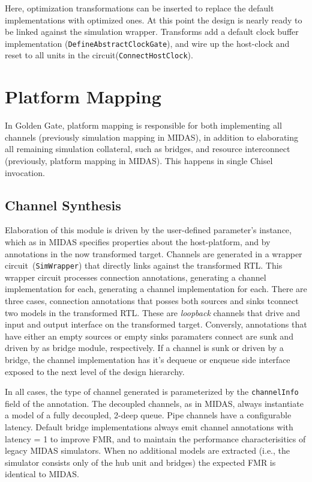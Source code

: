 Here, optimization transformations can be inserted to replace the default
implementations with optimized ones.  At this point the design is nearly ready
to be linked against the simulation wrapper.  Transforms add a default clock
buffer implementation (\texttt{DefineAbstractClockGate}), and wire up the
host-clock and reset to all units in the circuit(\texttt{ConnectHostClock}).

\section{Platform Mapping}\label{sec:gg-platform-mapping}

In Golden Gate, platform mapping is responsible for both implementing all
channels (previously simulation mapping in MIDAS), in addition to elaborating
all remaining simulation collateral, such as bridges, and resource interconnect
(previously, platform mapping in MIDAS). This happens in single Chisel
invocation.

\subsection{Channel Synthesis}
Elaboration of this module is driven by the user-defined parameter's instance,
which as in MIDAS specifies properties about the host-platform, and by
annotations in the now transformed target.  Channels are generated in a wrapper
circuit~(\texttt{SimWrapper}) that directly links against the transformed RTL.
This wrapper circuit processes connection annotations, generating a channel
implementation for each, generating a channel implementation for each.  There
are three cases, connection annotations that posses both sources and sinks
tconnect two models in the transformed RTL. These are \emph{loopback} channels
that drive and input and output interface on the transformed target. Conversly,
annotations that have either an empty sources or empty sinks paramaters connect
are sunk and driven by as bridge module, respectively. If a channel is sunk or
driven by a bridge, the channel implementation has it's dequeue or enqueue side
interface exposed to the next level of the design hierarchy.

In all cases, the type of channel generated is parameterized by the
\texttt{channelInfo} field of the annotation. The decoupled channels, as in
MIDAS, always instantiate a model of a fully decoupled, 2-deep queue. Pipe
channels have a configurable latency. Default bridge implementations always
emit channel annotations with latency = 1 to improve FMR, and to maintain the
performance characterisitics of legacy MIDAS simulators. When no additional
models are extracted (i.e., the simulator consists only of the hub unit and
bridges) the expected FMR is identical to MIDAS.

